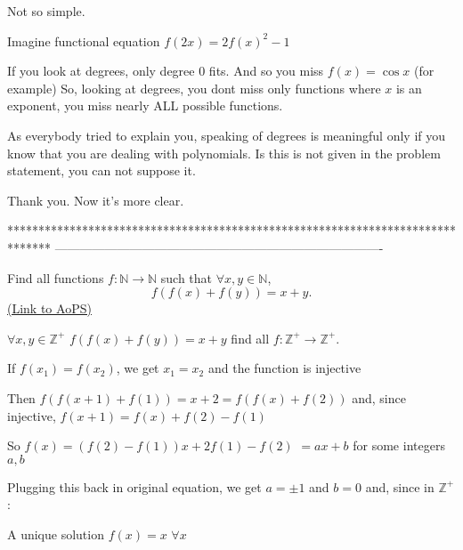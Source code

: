 \begin{solution}
	Not so simple.

Imagine functional equation $f(2x)=2f(x)^2-1$

If you look at degrees, only degree $0$ fits. And so you miss $f(x)=\cos x$ (for example)
So, looking at degrees, you dont miss only functions where $x$ is an exponent, you miss nearly ALL possible functions.

As everybody tried to explain you, speaking of degrees is meaningful only if you know that you are dealing with polynomials.
Is this is not given in the problem statement, you can not suppose it.


\end{solution}



\begin{solution}
	Thank you. Now it's more clear.
\end{solution}
*******************************************************************************
-------------------------------------------------------------------------------

\begin{problem}
	Find all functions $ f:\mathbb{N}\to \mathbb{N}$ such that $ \forall x,y\in\mathbb{N}$,
\[f(f(x)+f(y))=x+y.\]
	\flushright \href{https://artofproblemsolving.com/community/c6h406120}{(Link to AoPS)}
\end{problem}



\begin{solution}
	\begin{tcolorbox}$ \forall x,y\in\mathbb{Z^{+}} $
$f(f(x)+f(y))=x+y$
find all $ f:\mathbb{Z^{+}}\rightarrow\mathbb{Z^{+}} $.\end{tcolorbox}
If $f(x_1)=f(x_2)$, we get $x_1=x_2$ and the function is injective

Then $f(f(x+1)+f(1))=x+2=f(f(x)+f(2))$ and, since injective, $f(x+1)=f(x)+f(2)-f(1)$

So $f(x)=(f(2)-f(1))x+2f(1)-f(2)$ $=ax+b$ for some integers $a,b$

Plugging this back in original equation, we get $a=\pm 1$ and $b=0$ and, since in $\mathbb Z^+$ :

A unique solution $\boxed{f(x)=x}$ $\forall x$
\end{solution}



